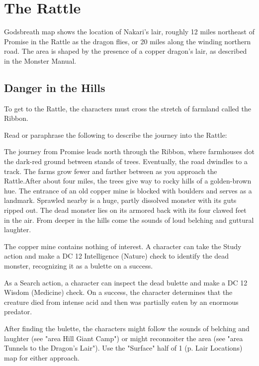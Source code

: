 \documentclass[letterpaper, 11pt, twocolumn]{dndbook}
\begin{document}
\section{The Rattle}



Godsbreath map shows the location of Nakari's lair, roughly 12 miles northeast of Promise in the Rattle as the dragon flies, or 20 miles along the winding northern road. The area is shaped by the presence of a copper dragon's lair, as described in the Monster Manual.

\subsection{Danger in the Hills}


To get to the Rattle, the characters must cross the stretch of farmland called the Ribbon.

Read or paraphrase the following to describe the journey into the Rattle:

\begin{DndReadAloud}
The journey from Promise leads north through the Ribbon, where farmhouses dot the dark-red ground between stands of trees. Eventually, the road dwindles to a track. The farms grow fewer and farther between as you approach the Rattle.After about four miles, the trees give way to rocky hills of a golden-brown hue. The entrance of an old copper mine is blocked with boulders and serves as a landmark. Sprawled nearby is a huge, partly dissolved monster with its guts ripped out. The dead monster lies on its armored back with its four clawed feet in the air. From deeper in the hills come the sounds of loud belching and guttural laughter.
\end{DndReadAloud}

The copper mine contains nothing of interest. A character can take the Study action and make a DC 12 Intelligence (Nature) check to identify the dead monster, recognizing it as a bulette on a success.

As a Search action, a character can inspect the dead bulette and make a DC 12 Wisdom (Medicine) check. On a success, the character determines that the creature died from intense acid and then was partially eaten by an enormous predator.

After finding the bulette, the characters might follow the sounds of belching and laughter (see "area Hill Giant Camp") or might reconnoiter the area (see "area Tunnels to the Dragon's Lair"). Use the "Surface" half of 1 (p. Lair Locations) map for either approach.
\end{document}
